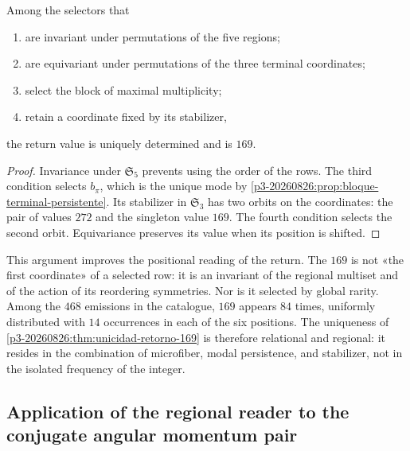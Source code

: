 \begin{theorem}
\label{p3-20260826:thm:unicidad-retorno-169}
Among the selectors that
\begin{enumerate}
  \item are invariant under permutations of the five regions;
  \item are equivariant under permutations of the three terminal
  coordinates;
  \item select the block of maximal multiplicity;
  \item retain a coordinate fixed by its stabilizer,
\end{enumerate}
the return value is uniquely determined and is \(169\).
\end{theorem}

\begin{proof}
Invariance under \(\mathfrak S_5\) prevents using the order of the rows. The
third condition selects \(b_\pi\), which is the unique mode by
\cref{p3-20260826:prop:bloque-terminal-persistente}. Its stabilizer in
\(\mathfrak S_3\) has two orbits on the coordinates: the pair of
values \(272\) and the singleton value \(169\). The fourth condition selects the
second orbit. Equivariance preserves its value when its position is shifted.
\end{proof}

This argument improves the positional reading of the return. The \(169\) is not
«the first coordinate» of a selected row: it is an invariant of the
regional multiset and of the action of its reordering symmetries.
Nor is it selected by global rarity. Among the \(468\) emissions in the
catalogue, \(169\) appears \(84\) times, uniformly distributed with
\(14\) occurrences in each of the six positions. The uniqueness of
\cref{p3-20260826:thm:unicidad-retorno-169} is therefore relational and regional: it resides
in the combination of microfiber, modal persistence, and stabilizer, not in the
isolated frequency of the integer.

\subsection{Application of the regional reader to the conjugate angular momentum pair}
\label{sec:s102:c38:2:6}


